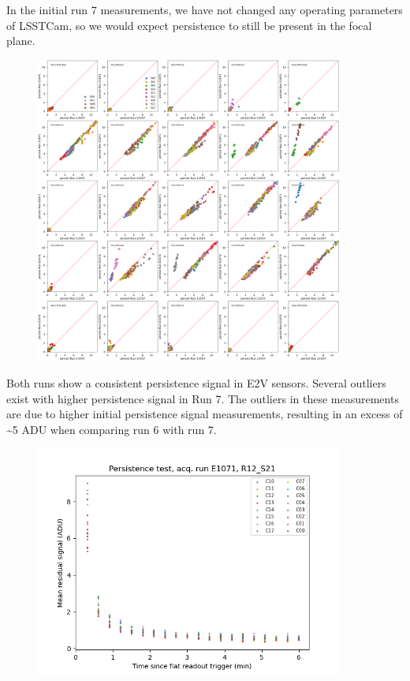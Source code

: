 In the initial run 7 measurements, we have not changed any operating
parameters of LSSTCam, so we would expect persistence to still be
present in the focal plane.

\begin{figure}
\begin{centering}
\includegraphics[width=0.9\textwidth]{sections/figures/baselineCharacterization/13557_E1071_persist.png}
\end{centering}
\end{figure}

Both runs show a consistent persistence signal in E2V sensors. Several
outliers exist with higher persistence signal in Run 7. The outliers in
these measurements are due to higher initial persistence signal
measurements, resulting in an excess of \textasciitilde5 ADU when
comparing run 6 with run 7.

\begin{figure}
\begin{centering}
\includegraphics[width=0.9\textwidth]{sections/figures/baselineCharacterization/persistence_plot_LSSTCam_R12_S21_u_lsstccs_eo_persistence_E1071_w_2024_35_20240925T180602Z.png}
\end{centering}
\end{figure}

